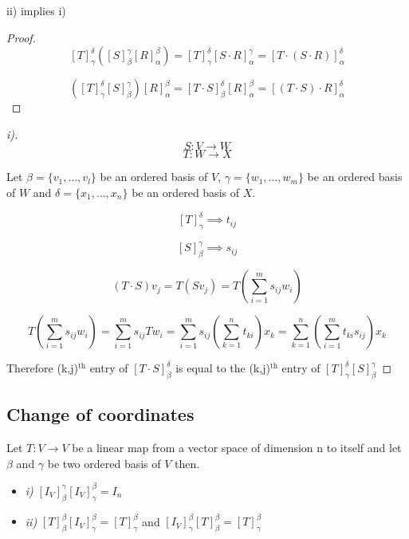 \documentclass[11pt,a4paper]{colorart}
\def\l{\left}
\def\r{\right}
\def\a{\alpha}
\def\b{\beta}
\def\g{\gamma}
\begin{document}
ii) implies i)

\begin{proof}
	\[ \l[T\r]_\g^\delta\l(\l[S\r]^\g_\b\l[R\r]^\b_\a \r) = \l[T\r]_\g^\delta \l[S\cdot R\r]^\g_\a = \l[T\cdot\l(S\cdot R\r)\r]^\delta_\a  \]

	\[ \l(\l[T\r]_\g^\delta \l[S\r]^\g_\b \r) \l[R\r]^\b_\a  = \l[T\cdot S\r]_\b^\delta \l[R\r]^\b_\a = \l[\l(T\cdot S\r)\cdot R\r]^\delta_\a \]

\end{proof}

\begin{proof}[i)]
	
\[ S:V\rightarrow W \]
\[ T:W\rightarrow X \]

	Let $\b = \{v_1,\dots,v_l\}$ be an ordered basis of $V$, $\g = \{w_1,\dots,w_m\}$ be an ordered basis of $W$ and $\delta = \{x_1,\dots,x_n\}$ be an ordered basis of $X$.

	\[ \l[T\r]^\delta_\g \implies t_{ij} \]

	\[ \l[S\r]^\g_\b \implies s_{ij} \]
	
	\[ \l(T\cdot S\r) v_j = T\l(Sv_j\r) = T \l(\sum_{i=1}^m s_{ij} w_i \r)   \] 
	
	\[ T \l(\sum_{i=1}^m s_{ij} w_i \r)  = \sum_{i=1}^m s_{ij}Tw_i = \sum_{i=1}^m s_{ij} \l( \sum_{k=1}^nt_{ki}\r) x_k = \sum_{k=1}^n \l(\sum_{i=1}^mt_{ki}s_{ij}\r) x_k \] 

	Therefore (k,j)$^\text{th}$ entry of $\l[T\cdot S\r]^\delta_\b$ is equal to the (k,j)$^\text{th}$ entry of $\l[T\r]_\g^\delta \l[S\r]^\g_\b$

\end{proof}

\subsection{Change of coordinates}

\begin{corollary}
	Let $T:V\rightarrow V$ be a linear map from a vector space of dimension n to itself and let $\b$ and $\g$ be two ordered basis of $V$ then.

	\begin{itemize}
		\item \textit{i) } $\l[I_V\r]^\g_\b \l[I_V\r]^\b_\g = I_n$
		\item \textit{ii)} $\l[T\r]^\b_\b \l[I_V\r]^\b_\g = \l[T\r]^\b_\g$ and $\l[I_V\r]^\b_\g \l[T\r]^\b_\b  = \l[T\r]^\b_\g$
	\end{itemize}
\end{corollary}
\end{document}
